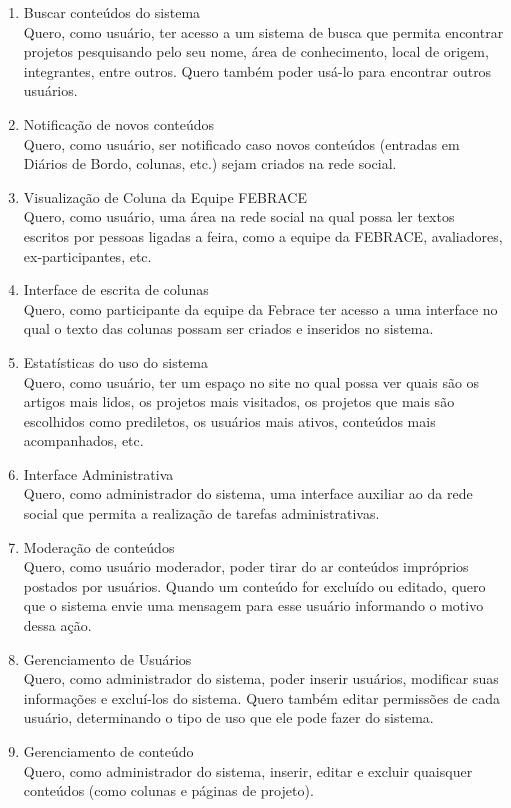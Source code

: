 \documentclass[a4paper,12pt,font=plain,header=plain]{abnt}
\begin{document}
\begin{enumerate}
	 \item Buscar conteúdos do sistema \\
		Quero, como usuário, ter acesso a  um sistema de busca que permita encontrar projetos pesquisando pelo seu nome, área de conhecimento, local de origem, integrantes, entre outros. Quero também poder usá-lo para encontrar outros usuários.
	 \item Notificação de novos conteúdos \\
		Quero, como usuário, ser notificado caso novos conteúdos (entradas em Diários de Bordo, colunas, etc.) sejam criados na rede social.
	 \item Visualização de Coluna da Equipe FEBRACE \\
		Quero, como usuário, uma área na rede social na qual possa ler textos escritos por pessoas ligadas a feira, como a equipe da FEBRACE, avaliadores, ex-participantes, etc.
	 \item Interface de escrita de colunas \\
    Quero, como participante da equipe da Febrace ter acesso a uma interface no qual o texto das colunas possam ser criados e inseridos no sistema.
	 \item Estatísticas do uso do sistema \\
		Quero, como usuário, ter um espaço no site no qual possa ver quais são os artigos mais lidos, os projetos mais visitados, os projetos que mais são escolhidos como prediletos, os usuários mais ativos, conteúdos mais acompanhados, etc.
	 \item Interface Administrativa \\
		Quero, como administrador do sistema, uma interface auxiliar ao da rede social que permita a realização de tarefas administrativas.
	 \item Moderação de conteúdos \\
		Quero, como usuário moderador, poder tirar do ar conteúdos impróprios postados por usuários. Quando um conteúdo for excluído ou editado, quero que o sistema envie uma mensagem para esse usuário informando o motivo dessa ação.
	 \item Gerenciamento de Usuários \\
		Quero, como administrador do sistema, poder inserir usuários, modificar suas informações e excluí-los do sistema. Quero também editar permissões de cada usuário, determinando o tipo de uso que ele pode fazer do sistema.
	 \item Gerenciamento de conteúdo \\
		Quero, como administrador do sistema, inserir, editar e excluir quaisquer conteúdos (como colunas e páginas de projeto).

\end{enumerate}
\end{document}
